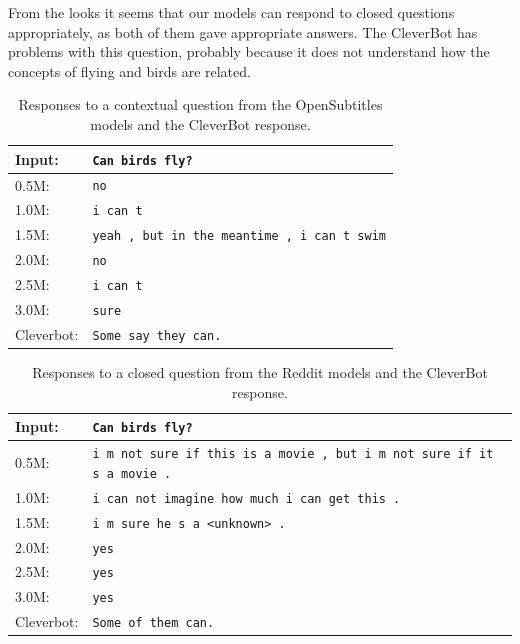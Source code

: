 From the looks it seems that our models can respond to closed questions appropriately, as both of them gave appropriate answers. The CleverBot has problems with this question, probably because it does not understand how the concepts of flying and birds are related.
\\
\begin{table}[H]
	\centering
	\begin{adjustbox}{max width=\textwidth}
		\begin{tabular}{ll}
			\toprule
			Input: 	& \texttt{Can birds fly?}\\
			\midrule
			0.5M: 	& \texttt{no}\\
			1.0M: 	& \texttt{i can t}\\
			1.5M:	& \texttt{yeah , but in the meantime , i can t swim}\\
			2.0M:	& \texttt{no}\\
			2.5M:	& \texttt{i can t}\\
			3.0M:	& \texttt{sure}\\
			Cleverbot:	& \texttt{Some say they can.}\\
			\bottomrule
		\end{tabular}
	\end{adjustbox}
	\caption{Responses to a contextual question from the OpenSubtitles models and the CleverBot response.}
	\label{results:example2_output:OpenSubtitle_compared}
\end{table}
\begin{table}[H]
	\centering
	\begin{adjustbox}{max width=\textwidth}
		\begin{tabular}{ll}
			\toprule
			Input: 	& \texttt{Can birds fly?}\\
			\midrule
			0.5M: 	& \texttt{i m not sure if this is a movie , but i m not sure if it s a movie .}\\
			1.0M: 	& \texttt{i can not imagine how much i can get this .}\\
			1.5M:	& \texttt{i m sure he s a <unknown> .}\\
			2.0M:	& \texttt{yes}\\
			2.5M:	& \texttt{yes}\\
			3.0M:	& \texttt{yes}\\
			Cleverbot:	& \texttt{Some of them can.}\\
			\bottomrule
		\end{tabular}
	\end{adjustbox}
	\caption{Responses to a closed question from the Reddit models and the CleverBot response.}
	\label{results:example2_output:Reddit_compared}
\end{table}

